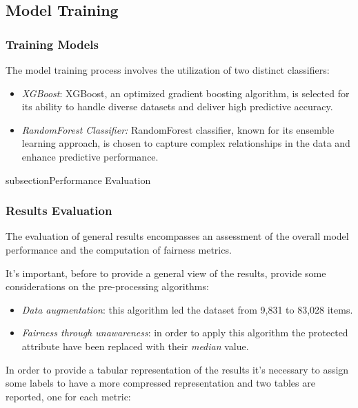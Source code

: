 \subsection{Model Training}

\subsubsection{Training Models}

The model training process involves the utilization of two distinct classifiers:

\begin{itemize}

    \item \emph{XGBoost}: XGBoost, an optimized gradient boosting algorithm, is selected for its ability to handle diverse datasets and deliver high predictive accuracy.

    \item \emph{RandomForest Classifier:} RandomForest classifier, known for its ensemble learning approach, is chosen to capture complex relationships in the data and enhance predictive performance.

\end{itemize}

subsection{Performance Evaluation}

\subsubsection{Results Evaluation}

The evaluation of general results encompasses an assessment of the overall model performance and the computation of fairness metrics.

It's important, before to provide a general view of the results, provide some considerations on the pre-processing algorithms:

\begin{itemize}
    \item \emph{Data augmentation}: this algorithm led the dataset from 9,831 to 83,028 items.
    \item \emph{Fairness through unawareness}: in order to apply this algorithm the protected attribute have been replaced with their \emph{median} value.
\end{itemize}

In order to provide a tabular representation of the results it's necessary to assign some labels to have a more compressed representation and two tables are reported, one for each metric:

